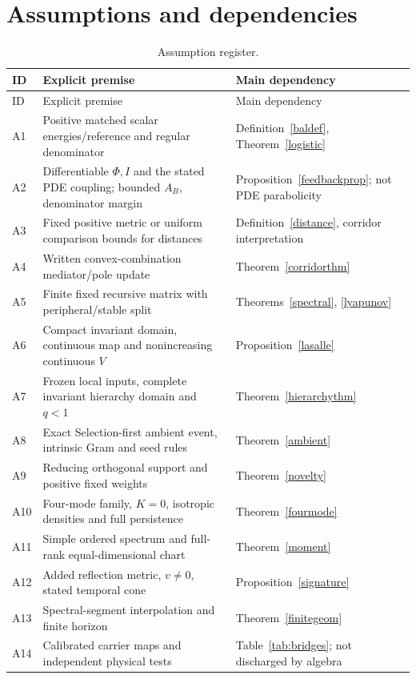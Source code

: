 \documentclass[11pt,letterpaper]{article}
\theoremstyle{definition}
\numberwithin{equation}{section}
\begin{document}
\section{Assumptions and dependencies}
\begin{longtable}{p{}p{}p{}}
\caption{Assumption register.}\label{tab:assumptions}\\
\toprule ID & Explicit premise & Main dependency\\\midrule\endfirsthead
\toprule ID & Explicit premise & Main dependency\\\midrule\endhead
A1 & Positive matched scalar energies/reference and regular denominator & Definition~\ref{baldef}, Theorem~\ref{logistic}\\
A2 & Differentiable $\Phi,I$ and the stated PDE coupling; bounded $A_B$, denominator margin & Proposition~\ref{feedbackprop}; not PDE parabolicity\\
A3 & Fixed positive metric or uniform comparison bounds for distances & Definition~\ref{distance}, corridor interpretation\\
A4 & Written convex-combination mediator/pole update & Theorem~\ref{corridorthm}\\
A5 & Finite fixed recursive matrix with peripheral/stable split & Theorems~\ref{spectral}, \ref{lyapunov}\\
A6 & Compact invariant domain, continuous map and nonincreasing continuous $V$ & Proposition~\ref{lasalle}\\
A7 & Frozen local inputs, complete invariant hierarchy domain and $q<1$ & Theorem~\ref{hierarchythm}\\
A8 & Exact Selection-first ambient event, intrinsic Gram and seed rules & Theorem~\ref{ambient}\\
A9 & Reducing orthogonal support and positive fixed weights & Theorem~\ref{novelty}\\
A10 & Four-mode family, $K=0$, isotropic densities and full persistence & Theorem~\ref{fourmode}\\
A11 & Simple ordered spectrum and full-rank equal-dimensional chart & Theorem~\ref{moment}\\
A12 & Added reflection metric, $v\ne0$, stated temporal cone & Proposition~\ref{signature}\\
A13 & Spectral-segment interpolation and finite horizon & Theorem~\ref{finitegeom}\\
A14 & Calibrated carrier maps and independent physical tests & Table~\ref{tab:bridges}; not discharged by algebra\\

\end{longtable}
\end{document}
